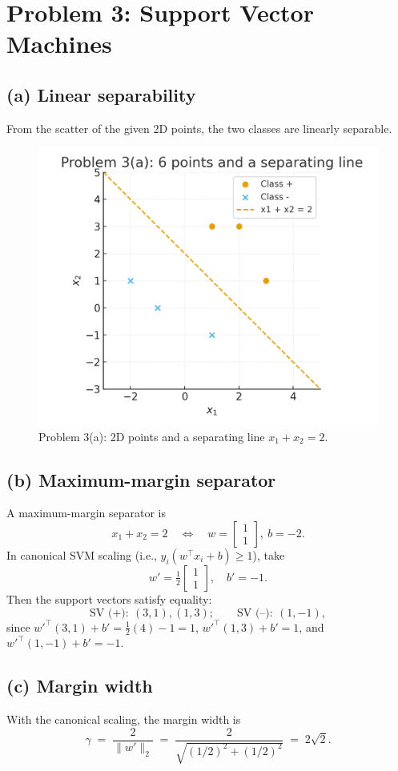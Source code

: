 \documentclass[11pt]{article}
\begin{document}
\section{Problem 3: Support Vector Machines}

\subsection*{(a) Linear separability}
From the scatter of the given 2D points, the two classes are linearly separable.
\begin{figure}[h]
    \centering
    \includegraphics[width=0.65\linewidth]{./problem3a_svm_plot_fixed.png}
    \caption{Problem 3(a): 2D points and a separating line $x_1+x_2=2$.}
  \end{figure}
  
\subsection*{(b) Maximum-margin separator}
A maximum-margin separator is
\[
x_1 + x_2 = 2
\quad\Longleftrightarrow\quad
w=\begin{bmatrix}1\\[2pt]1\end{bmatrix},\ b=-2.
\]
In canonical SVM scaling (i.e., $y_i(w^\top x_i+b)\ge 1$), take
\[
w'=\tfrac12\!\begin{bmatrix}1\\[2pt]1\end{bmatrix},\quad b'=-1.
\]
Then the support vectors satisfy equality:
\[
\text{SV (+)}:\ (3,1),(1,3);\qquad \text{SV (–)}:\ (1,-1),
\]
since $w'^\top(3,1)+b'=\tfrac12(4)-1=1$, $w'^\top(1,3)+b'=1$, and $w'^\top(1,-1)+b'=-1$.

\subsection*{(c) Margin width}
With the canonical scaling, the margin width is
\[
\gamma \;=\; \frac{2}{\|w'\|_2}
\;=\; \frac{2}{\sqrt{(1/2)^2+(1/2)^2}}
\;=\; 2\sqrt{2}.
\]
\end{document}
